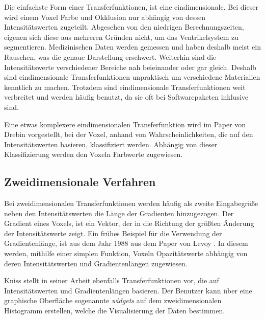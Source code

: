 Die einfachste Form einer Transferfunktionen, ist eine eindimensionale. Bei dieser wird einem Voxel Farbe und Okklusion nur abhängig von dessen Intensitätswerten zugeteilt.
\newline
Abgesehen von den niedrigen Berechnungszeiten, eigenen sich diese aus mehreren Gründen nicht, um das Ventrikelsystem zu segmentieren. Medizinischen Daten werden gemessen und haben deshalb meist ein Rauschen, was die genaue Darstellung erschwert. Weiterhin sind die Intensitätswerte verschiedener Bereiche nah beieinander oder gar gleich. Deshalb sind eindimensionale Transferfunktionen unpraktisch um verschiedene Materialien kenntlich zu machen.
\newline
Trotzdem sind eindimensionale Transferfunktionen weit verbreitet und werden häufig benutzt, da sie oft bei Softwarepaketen inklusive sind.


Eine etwas komplexere eindimensionalen Transferfunktion wird im Paper von Drebin \cite{drebin1988volume} vorgestellt, bei der Voxel, anhand von Wahrscheinlichkeiten, die auf den Intensitätswerten basieren, klassifiziert werden. Abhängig von dieser Klassifizierung werden den Voxeln Farbwerte zugewiesen.



\subsection{Zweidimensionale Verfahren}

Bei zweidimensionalen Transferfunktionen werden häufig als zweite Eingabegröße neben den Intensitätswerten die Länge der Gradienten hinzugezogen. Der Gradient eines Voxels, ist ein Vektor, der in die Richtung der größten Änderung der Intensitätswerte zeigt.
\newline
Ein frühes Beispiel für die Verwendung der Gradientenlänge, ist aus dem Jahr 1988 aus dem Paper von Levoy \cite{levoy1988display}. In diesem werden, mithilfe einer simplen Funktion, Voxeln Opazitätswerte abhängig von deren Intensitätswerten und Gradientenlängen zugewiesen.

Kniss stellt in seiner Arbeit \cite{kniss2002multidimensional} ebenfalls Transferfunktionen vor, die auf Intensitätswerten und Gradientenlängen basieren. Der Benutzer kann über eine graphische Oberfläche sogenannte \textit{widgets} auf dem zweidimensionalen Histogramm erstellen, welche die Visualisierung der Daten bestimmen.

